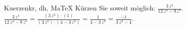 \begin{MAufgabe}{Kuerzen}{kr, dh, MaTeX}
K\"urzen Sie soweit m\"oglich: $\frac{3\, z^4}{12\, z^4 - 9\, z^7}$.\\ 
\ifLsg\MLoesung
\quad $\frac{3\, z^4}{12\, z^4 - 9\, z^7}=\frac{(3\, z^4)\cdot(1)}{(3\, z^4)\cdot(4 - 3\, z^3)}=\frac{1}{4 - 3\, z^3}=\frac{-1}{3\, z^3 - 4}$.\else\relax\fi
 \end{MAufgabe}